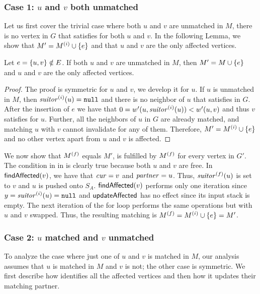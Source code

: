 \subsubsection{Case 1: $u$ and $v$ both unmatched}
%
Let us first cover the trivial case where both $u$ and $v$ are unmatched in $M$, \ie
there is no vertex in $G$ that satisfies  for both $u$ and $v$.
In the following Lemma, we show that $M' = M\interm\cup \set{e}$ and that $u$
and $v$ are the only affected vertices.

\begin{lemma}
\label{lemma:dyn-mwm:insert-case-1}
Let $e = \set{u, v} \notin E$. If both $u$ and $v$ are unmatched in $M$, then
$M' = M \cup \set{e}$ and $u$ and $v$ are the only affected vertices.
\end{lemma}

\begin{proof}
The proof is symmetric for $u$ and $v$, we develop it for $u$.
If $u$ is unmatched in $M$, then $\mathit{suitor}^{(i)}(u) = \texttt{null}$ and there
is no neighbor of $u$ that satisfies  in $G$.
After the insertion of $e$ we have that $0 = w'(u, \mathit{suitor}^{(i)}(u)) < w'(u,
v)$ and thus $v$ satisfies  for $u$.
Further, all the neighbors of $u$ in $G$ are already matched,
and matching $u$ with $v$ cannot invalidate  for any of them.
Therefore, $M' = M\interm \cup \set{e}$ and no other vertex apart from $u$ and
$v$ is affected.
\end{proof}

We now show that $M^{(f)}$ equals $M'$, \ie {} is fulfilled by
$M^{(f)}$ for every vertex in $G'$. The condition in
 in
 is clearly true because both $u$ and $v$ are
free. In $\textsf{findAffected}(v)$, we have that $\mathit{cur} = v$ and $\mathit{partner} = u$. Thus,
$\mathit{suitor}^{(f)}(u)$ is set to $v$ and $u$ is pushed onto $S_A$. $\textsf{findAffected}(v)$
performs only one iteration since $y = \mathit{suitor}^{(i)}(u) = \texttt{null}$ and
$\textsf{updateAffected}$ has no effect since its input stack is empty. The next iteration
of the for loop performs the same operations but with $u$ and $v$ swapped.
Thus, the resulting matching is $M\final = M\interm\cup\set{e} = M'$.

\subsubsection{Case 2: $u$ matched and $v$ unmatched}
To analyze the case where just one of $u$ and $v$ is matched in $M$, our
analysis assumes \wilog that $u$ is matched in $M$ and $v$ is not; the other
case is symmetric. We first describe how 
identifies all the affected vertices and then how it updates their matching
partner.

